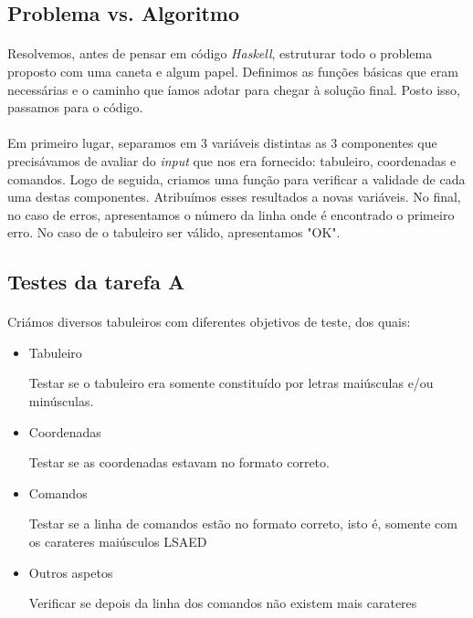 \documentclass[a4paper,12pt]{article}
\begin{document}
\subsection{Problema vs. Algoritmo}

\paragraph{}
Resolvemos, antes de pensar em código \emph{Haskell}, estruturar todo o problema proposto com uma caneta e algum papel. Definimos as funções básicas que eram necessárias e o caminho que íamos adotar para chegar à solução final. Posto isso, passamos para o código.

\paragraph{}
Em primeiro lugar, separamos em 3 variáveis distintas as 3 componentes que precisávamos de avaliar do \emph{input} que nos era fornecido: tabuleiro, coordenadas e comandos.
Logo de seguida, criamos uma função para verificar a validade de cada uma destas componentes. Atribuímos esses resultados a novas variáveis. No final, no caso de erros, apresentamos o número da linha onde é encontrado o primeiro erro. No caso de o tabuleiro ser válido, apresentamos "OK".



\subsection{Testes da tarefa A}

\paragraph{}
Criámos diversos tabuleiros com diferentes objetivos de teste, dos quais:
\begin{itemize}
\item Tabuleiro

Testar se o tabuleiro era somente constituído por letras maiúsculas e/ou minúsculas.
\item Coordenadas

Testar se as coordenadas estavam no formato correto.
\item Comandos

Testar se a linha de comandos estão no formato correto, isto é, somente com os carateres maiúsculos LSAED
\item Outros aspetos

Verificar se depois da linha dos comandos não existem mais carateres

\end{itemize}
\end{document}
